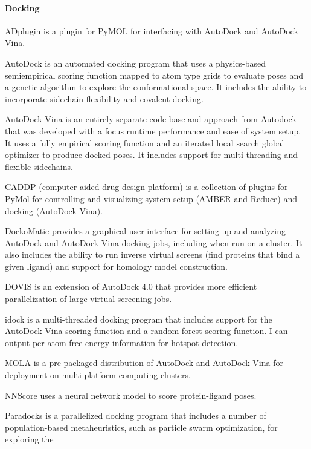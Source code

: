 \paragraph{Docking}

ADplugin is a plugin for PyMOL for interfacing with AutoDock and AutoDock Vina.

AutoDock \cite{Morris_2009} is an automated docking program that uses a physics-based semiempirical scoring function \cite{Huey_2007} mapped to atom type grids to evaluate poses and a genetic algorithm to explore the conformational space.  It includes the ability to incorporate sidechain flexibility and covalent docking.

AutoDock Vina \cite{Trott_2009} is an entirely separate code base and approach from Autodock that was developed with a focus runtime performance and ease of system setup. It uses a fully empirical scoring function and an iterated local search global optimizer to produce docked poses. It includes support for multi-threading and flexible sidechains.

CADDP (computer-aided drug design platform) \cite{Lill_2010} is a collection of plugins for PyMol for controlling and visualizing system setup (AMBER and Reduce) and docking (AutoDock Vina).

DockoMatic \cite{Bullock_2013}  provides a graphical user interface for setting up and analyzing AutoDock and AutoDock Vina docking jobs, including when run on a cluster. It also includes the ability to run inverse virtual screens (find proteins that bind a given ligand) and support for homology model construction.

DOVIS \cite{Jiang_2008} is an extension of AutoDock 4.0 that provides more efficient parallelization of large virtual screening jobs.

idock \cite{Li_2012} is a multi-threaded docking program that includes support for the AutoDock Vina scoring function and a random forest scoring function. I can output per-atom free energy information for hotspot detection.

MOLA \cite{Abreu_2010} is a pre-packaged distribution of AutoDock and AutoDock Vina for deployment on multi-platform computing clusters.

NNScore \cite{Durrant_2011} uses a neural network model to score protein-ligand poses.

Paradocks \cite{Meier_2010} is a parallelized docking program that includes a number of population-based metaheuristics, such as particle swarm optimization, for exploring the 

